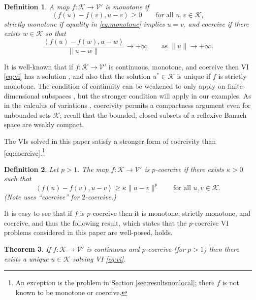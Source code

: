 \documentclass[letterpaper,final,12pt,reqno]{amsart}
\theoremstyle{cstyle}
\newtheorem{theorem}{Theorem}
\theoremstyle{dstyle}
\newtheorem{definition}[theorem]{Definition}
\numberwithin{equation}{section}
\numberwithin{figure}{section}
\numberwithin{table}{section}
\numberwithin{theorem}{section}
\newcommand{\cK}{\mathcal{K}}
\newcommand{\cV}{\mathcal{V}}
\newcommand{\ip}[2]{\left<#1,#2\right>}
\begin{document}
\begin{definition} A map $f:\cK \to \cV'$ is \emph{monotone} if
\begin{equation}
\ip{f(u)-f(v)}{u-v} \ge 0 \qquad \text{for all } u,v \in \cK, \label{eq:monotone}
\end{equation}
\emph{strictly monotone} if equality in \eqref{eq:monotone} implies $u=v$, and \emph{coercive} if there exists $w \in \cK$ so that
\begin{equation}
\frac{\ip{f(u)-f(w)}{u-w}}{\|u-w\|} \to +\infty \qquad \text{as } \|u\|\to +\infty. \label{eq:coercive}
\end{equation}
\end{definition}

It is well-known that if $f:\cK \to \cV'$ is continuous, monotone, and coercive then VI \eqref{eq:vi} has a solution \cite[Corollary III.1.8]{KinderlehrerStampacchia1980}, and also that the solution $u^* \in \cK$ is unique if $f$ is strictly monotone.  The condition of continuity can be weakened to only apply on finite-dimensional subspaces \cite{KinderlehrerStampacchia1980}, but the stronger condition will apply in our examples.  As in the calculus of variations \cite{Evans2010}, coercivity permits a compactness argument even for unbounded sets $\cK$; recall that the bounded, closed subsets of a reflexive Banach space are weakly compact.

The VIs solved in this paper satisfy a stronger form of coercivity than \eqref{eq:coercive}.\footnote{An exception is the problem in Section \ref{sec:resultsnonlocal}; there $f$ is not known to be monotone or coercive.}

\begin{definition}  Let $p>1$.  The map $f:\cK \to \cV'$ is \emph{$p$-coercive} if there exists $\kappa>0$ such that
\begin{equation}
\ip{f(u)-f(v)}{u-v} \ge \kappa \|u-v\|^p \qquad \text{for all } u,v \in \cK. \label{eq:pcoercive}
\end{equation}
(Note \cite{Tai2003} uses ``coercive'' for $2$-coercive.)
\end{definition}

It is easy to see that if $f$ is $p$-coercive then it is monotone, strictly monotone, and coercive, and thus the following result, which states that the $p$-coercive VI problems considered in this paper are well-posed, holds.

\begin{theorem}  \label{thm:viwellposed}  If $f:\cK \to \cV'$ is continuous and $p$-coercive (for $p>1$) then there exists a unique $u\in \cK$ solving VI \eqref{eq:vi}.
\end{theorem}
\end{document}
